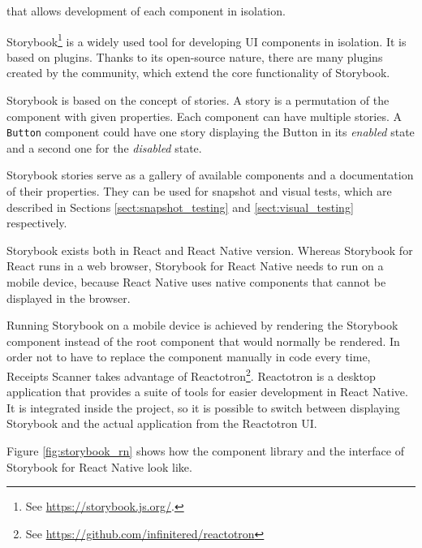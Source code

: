 \documentclass[
  digital, %
  table,   %
  oneside, %
  lof,     %
  lot,     %
]{fithesis3}
\begin{document}
that allows development of each component in isolation.

Storybook\footnote{See \url{https://storybook.js.org/}.} is a widely used tool for developing UI components in isolation. It is based on plugins. Thanks to its open-source nature, there are many plugins created by the community, which extend the core functionality of Storybook.

Storybook is based on the concept of stories. A story is a permutation of the component with given properties. Each component can have multiple stories. A \texttt{Button} component could have one story displaying the Button in its \textit{enabled} state and a second one for the \textit{disabled} state.

Storybook stories serve as a gallery of available components and a documentation of their properties. They can be used for snapshot and visual tests, which are described in Sections \ref{sect:snapshot_testing} and \ref{sect:visual_testing} respectively.

Storybook exists both in React and React Native version. 
Whereas Storybook for React runs in a web browser, Storybook for React Native needs to run on a mobile device, because React Native uses native components that cannot be displayed in the browser. 

\label{phantom:reactotron}
Running Storybook on a mobile device is achieved by rendering the Storybook component instead of the root component that would normally be rendered. In order not to have to replace the component manually in code every time, Receipts Scanner takes advantage of Reactotron\footnote{See \url{https://github.com/infinitered/reactotron}}. Reactotron is a desktop application that provides a suite of tools for easier development in React Native. It is integrated inside the project, so it is possible to switch between displaying Storybook and the actual application from the Reactotron UI. 

Figure \ref{fig:storybook_rn} shows how the component library and the interface of Storybook for React Native look like.
\end{document}
